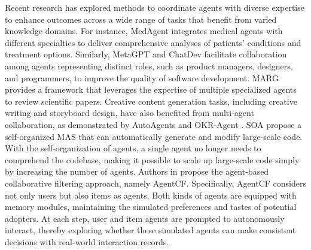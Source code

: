 \documentclass[acmsmall,nonacm]{acmart}
\begin{document}
        Recent research has explored methods to coordinate agents with diverse expertise to enhance outcomes across a wide range of tasks that benefit from varied knowledge domains. For instance, MedAgent \cite{tang-etal-2024-medagents} integrates medical agents with different specialties to deliver comprehensive analyses of patients' conditions and treatment options. Similarly, MetaGPT \cite{hong2024metagpt} and ChatDev \cite{qian-etal-2024-chatdev} facilitate collaboration among agents representing distinct roles, such as product managers, designers, and programmers, to improve the quality of software development. MARG \cite{darcy2024margmultiagentreviewgeneration} provides a framework that leverages the expertise of multiple specialized agents to review scientific papers. Creative content generation tasks, including creative writing and storyboard design, have also benefited from multi-agent collaboration, as demonstrated by AutoAgents \cite{ijcai2024p3} and OKR-Agent \cite{zheng2023agentsmeetokrobject}. SOA \cite{ishibashi2024selforganizedagentsllmmultiagent} propose a self-organized MAS that can automatically generate and modify large-scale code. With the self-organization of agents, a single agent no longer needs to comprehend the codebase, making it possible to scale up large-scale code simply by increasing the number of agents. Authors in \cite{10.1145/3589334.3645537} propose the agent-based collaborative filtering approach, namely AgentCF. Specifically, AgentCF considers not only users but also items as agents. Both kinds of agents are equipped with memory modules, maintaining the simulated preferences and tastes of potential adopters. At each step, user and item agents are prompted to autonomously interact, thereby exploring whether these simulated agents can make consistent decisions with real-world interaction records.
\end{document}
